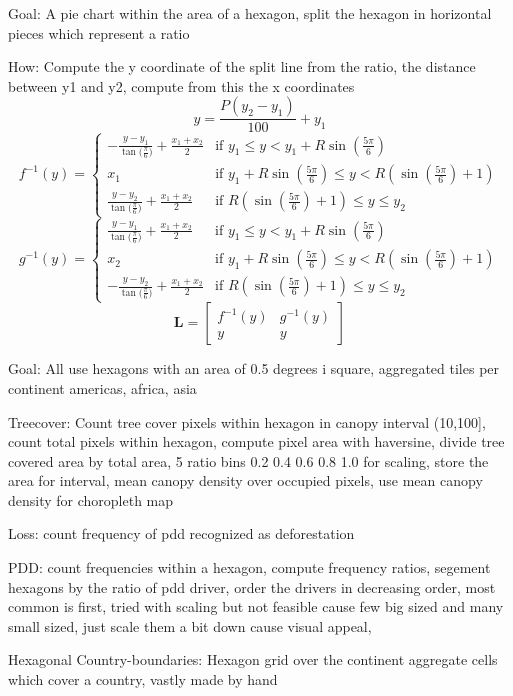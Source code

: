 		Goal: A pie chart within the area of a hexagon, split the hexagon in horizontal pieces which represent a ratio

		How: Compute the y coordinate of the split line from the ratio, the distance between y1 and y2, compute from this the x coordinates
		\begin{equation}
		\label{eq:hexagon_ratio}
			y = \frac{P(y_2-y_1)}{100} + y_1
		\end{equation}
		\begin{equation}
		\label{eq:hexagon_left_intersection}
			f^{-1}(y) =
			\begin{cases} 
				-\frac{y - y_1}{\tan{(\frac{\pi}{6}})} + \frac{x_1 + x_2}{2} & \text{if } y_1 \le y < y_1 + R\sin{(\frac{5\pi}{6})} \\
				x_1 & \text{if } y_1 + R\sin{(\frac{5\pi}{6})} \le y < R(\sin{(\frac{5\pi}{6})} + 1) \\
				\frac{y - y_2}{\tan{(\frac{\pi}{6}})} + \frac{x_1 + x_2}{2} & \text{if } R(\sin{(\frac{5\pi}{6})} + 1) \le y \le y_2
			\end{cases}
		\end{equation}
		\begin{equation}
		\label{eq:hexagon_right_intersection}
			g^{-1}(y) = 
			\begin{cases} 
				\frac{y - y_1}{\tan{(\frac{\pi}{6}})} + \frac{x_1 + x_2}{2} & \text{if } y_1 \le y < y_1 + R\sin{(\frac{5\pi}{6})} \\
				x_2 & \text{if } y_1 + R\sin{(\frac{5\pi}{6})} \le y < R(\sin{(\frac{5\pi}{6})} + 1) \\
				-\frac{y - y_2}{\tan{(\frac{\pi}{6}})} + \frac{x_1 + x_2}{2} & \text{if } R(\sin{(\frac{5\pi}{6})} + 1) \le y \le y_2
			\end{cases}
		\end{equation}
		\begin{equation}
		\label{eq:hexagon_split_line}
			\mathbf{L} =
			\begin{bmatrix}
				f^{-1}(y) & g^{-1}(y) \\
				y & y
			\end{bmatrix}
		\end{equation}

		Goal: All use hexagons with an area of 0.5 degrees i square, aggregated tiles per continent americas, africa, asia

		Treecover: Count tree cover pixels within hexagon in canopy interval (10,100], count total pixels within hexagon, compute pixel area with haversine, divide tree covered area by total area, 5 ratio bins 0.2 0.4 0.6 0.8 1.0 for scaling, store the area for interval, mean canopy density over occupied pixels, use mean canopy density for choropleth map

		Loss: count frequency of pdd recognized as deforestation 

		PDD: count frequencies within a hexagon, compute frequency ratios, segement hexagons by the ratio of pdd driver, order the drivers in decreasing order, most common is first, tried with scaling but not feasible cause few big sized and many small sized, just scale them a bit down cause visual appeal,

		Hexagonal Country-boundaries: Hexagon grid over the continent aggregate cells which cover a country, vastly made by hand
